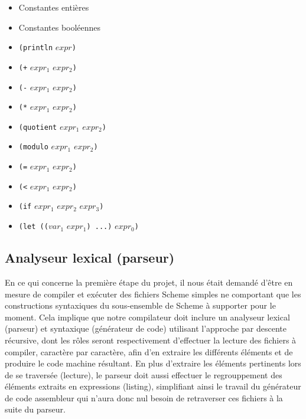 \documentclass[12pt]{article}
\begin{document}
\begin{itemize}
\item Constantes entières
\item Constantes booléennes
\item \texttt{(println} $expr$\texttt{)}
\item \texttt{(+} $expr_1$ $expr_2$\texttt{)}
\item \texttt{(-} $expr_1$ $expr_2$\texttt{)}
\item \texttt{(*} $expr_1$ $expr_2$\texttt{)}
\item \texttt{(quotient} $expr_1$ $expr_2$\texttt{)}
\item \texttt{(modulo} $expr_1$ $expr_2$\texttt{)}
\item \texttt{(=} $expr_1$ $expr_2$\texttt{)}
\item \texttt{(<} $expr_1$ $expr_2$\texttt{)}
\item \texttt{(if} $expr_1$ $expr_2$ $expr_3$\texttt{)}
\item \texttt{(let ((}$var_1$ $expr_1$\texttt{) ...)} $expr_0$\texttt{)}
\end{itemize}

\subsection{Analyseur lexical (parseur)}
En ce qui concerne la première étape du projet, il nous était demandé d'être en mesure de compiler et exécuter des fichiers Scheme simples ne comportant que les constructions syntaxiques du sous-ensemble de Scheme à supporter pour le moment. Cela implique que notre compilateur doit inclure un analyseur lexical (parseur) et syntaxique (générateur de code) utilisant l'approche par descente récursive, dont les rôles seront respectivement d'effectuer la lecture des fichiers à compiler, caractère par caractère, afin d'en extraire les différents éléments et de produire le code machine résultant. En plus d'extraire les éléments pertinents lors de se traversée (lecture), le parseur doit aussi effectuer le regrouppement des éléments extraits en expressions (listing), simplifiant ainsi le travail du générateur de code assembleur qui n'aura donc nul besoin de retraverser ces fichiers à la suite du parseur.
\end{document}
